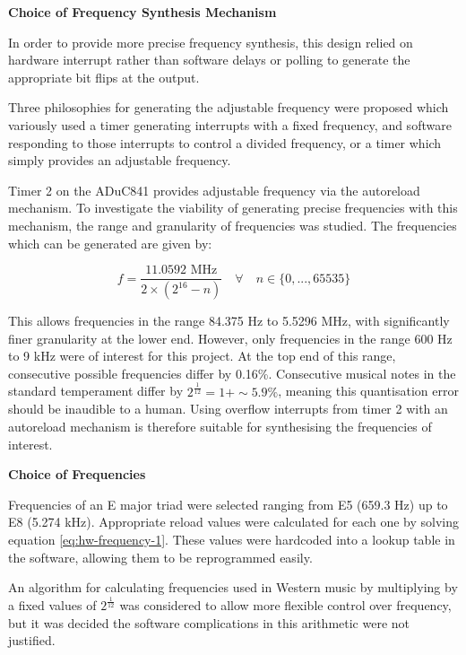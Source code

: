 \documentclass[11pt]{article}
\begin{document}
\textbf{Choice of Frequency Synthesis Mechanism}

In order to provide more precise frequency synthesis, this design relied on hardware interrupt rather than software delays or polling to generate the appropriate bit flips at the output.

Three philosophies for generating the adjustable frequency were proposed which variously used a timer generating interrupts with a fixed frequency, and software responding to those interrupts to control a divided frequency, or a timer which simply provides an adjustable frequency.

Timer 2 on the ADuC841 provides adjustable frequency via the autoreload mechanism. To investigate the viability of generating precise frequencies with this mechanism, the range and granularity of frequencies was studied. The frequencies which can be generated are given by:

\begin{equation}
    f=\frac{11.0592 \text{ MHz}}{2\times(2^{16}-n)} \quad \forall \quad n \in \{ 0,...,65535 \}
    \label{eq:hw-frequency-1}
\end{equation}

This allows frequencies in the range 84.375 Hz to 5.5296 MHz, with significantly finer granularity at the lower end. However, only frequencies in the range 600 Hz to 9 kHz were of interest for this project. At the top end of this range, consecutive possible frequencies differ by 0.16\%. Consecutive musical notes in the standard temperament differ by $2^\frac{1}{12}=1+\sim 5.9\%$, meaning this quantisation error should be inaudible to a human. Using overflow interrupts from timer 2 with an autoreload mechanism is therefore suitable for synthesising the frequencies of interest.

\textbf{Choice of Frequencies}

Frequencies of an E major triad were selected ranging from E5 (659.3 Hz) up to E8 (5.274 kHz). Appropriate reload values were calculated for each one by solving equation \ref{eq:hw-frequency-1}. These values were hardcoded into a lookup table in the software, allowing them to be reprogrammed easily.

An algorithm for calculating frequencies used in Western music by multiplying by a fixed values of $2^\frac{1}{12}$ was considered to allow more flexible control over frequency, but it was decided the software complications in this arithmetic were not justified.
\end{document}
